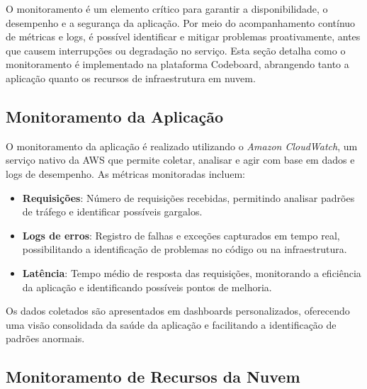 
O monitoramento é um elemento crítico para garantir a disponibilidade, o desempenho e a segurança da aplicação. Por meio do acompanhamento contínuo de métricas e logs, é possível identificar e mitigar problemas proativamente, antes que causem interrupções ou degradação no serviço. Esta seção detalha como o monitoramento é implementado na plataforma Codeboard, abrangendo tanto a aplicação quanto os recursos de infraestrutura em nuvem.

\subsection{Monitoramento da Aplicação}


O monitoramento da aplicação é realizado utilizando o \emph{Amazon CloudWatch}, um serviço nativo da AWS que permite coletar, analisar e agir com base em dados e logs de desempenho. As métricas monitoradas incluem:

\begin{itemize}
    \item \textbf{Requisições}: Número de requisições recebidas, permitindo analisar padrões de tráfego e identificar possíveis gargalos.
    \item \textbf{Logs de erros}: Registro de falhas e exceções capturados em tempo real, possibilitando a identificação de problemas no código ou na infraestrutura.
    \item \textbf{Latência}: Tempo médio de resposta das requisições, monitorando a eficiência da aplicação e identificando possíveis pontos de melhoria.
\end{itemize}

Os dados coletados são apresentados em dashboards personalizados, oferecendo uma visão consolidada da saúde da aplicação e facilitando a identificação de padrões anormais.


\subsection{Monitoramento de Recursos da Nuvem}



